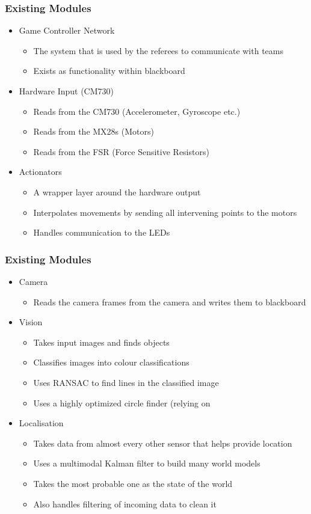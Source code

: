 \documentclass{beamer}
\begin{document}
\begin{frame}
	\frametitle{Existing Modules}
	\begin{itemize}
		\item Game Controller Network
			\begin{itemize}
				\item The system that is used by the referees to communicate with teams
				\item Exists as functionality within blackboard
			\end{itemize}
		\item Hardware Input (CM730)
			\begin{itemize}
				\item Reads from the CM730 (Accelerometer, Gyroscope etc.)
				\item Reads from the MX28s (Motors)
				\item Reads from the FSR (Force Sensitive Resistors)
			\end{itemize}
		\item Actionators
			\begin{itemize}
				\item A wrapper layer around the hardware output
				\item Interpolates movements by sending all intervening points to the motors
				\item Handles communication to the LEDs
			\end{itemize}
	\end{itemize}
\end{frame}

\begin{frame}
	\frametitle{Existing Modules}
	\begin{itemize}
		\item Camera
			\begin{itemize}
				\item Reads the camera frames from the camera and writes them to blackboard
			\end{itemize}
		\item Vision
			\begin{itemize}
				\item Takes input images and finds objects
				\item Classifies images into colour classifications
				\item Uses RANSAC to find lines in the classified image
				\item Uses a highly optimized circle finder (relying on 
			\end{itemize}
		\item Localisation
			\begin{itemize}
				\item Takes data from almost every other sensor that helps provide location
				\item Uses a multimodal Kalman filter to build many world models
				\item Takes the most probable one as the state of the world
				\item Also handles filtering of incoming data to clean it
			\end{itemize}
	\end{itemize}
\end{frame}
\end{document}
